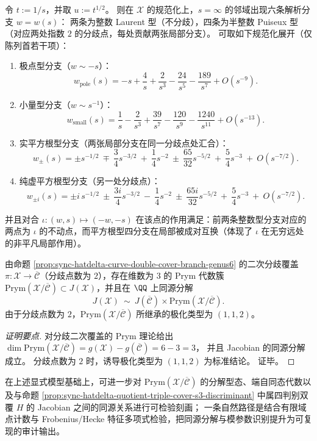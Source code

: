 \begin{remark}[\texorpdfstring{$s=\infty$}{s=infty} 处的 Puiseux 分支分类与显式展开]\label{rem:sync-hatdelta-puiseux-at-infty}
令 \(t:=1/s\)，并取 \(u:=t^{1/2}\)。
则在 \(\mathcal{X}\) 的规范化上，\(s=\infty\) 的邻域出现六条解析分支 \(w=w(s)\)：
两条为整数 Laurent 型（不分歧），四条为半整数 Puiseux 型（对应两处指数 \(2\) 的分歧点，每处贡献两张局部分支）。
可取如下规范化展开（仅陈列首若干项）：
\begin{enumerate}
  \item 极点型分支（\(w\sim -s\)）：
  \[
  w_{\mathrm{pole}}(s)= -s+\frac{4}{s}+\frac{2}{s^3}-\frac{24}{s^5}-\frac{189}{s^7}+O(s^{-9}).
  \]
  \item 小量型分支（\(w\sim s^{-1}\)）：
  \[
  w_{\mathrm{small}}(s)= \frac{1}{s}-\frac{2}{s^3}+\frac{39}{s^7}-\frac{120}{s^9}-\frac{1240}{s^{11}}+O(s^{-13}).
  \]
  \item 实平方根型分支（两张局部分支在同一分歧点处汇合）：
  \[
  w_{\pm}(s)=\pm s^{-1/2}\ \mp\ \frac{3}{4}s^{-3/2}\ +\ \frac{1}{4}s^{-2}\ \pm\ \frac{65}{32}s^{-5/2}\ +\ \frac{5}{4}s^{-3}\ +\ O(s^{-7/2}).
  \]
  \item 纯虚平方根型分支（另一处分歧点）：
  \[
  w_{\pm i}(s)=\pm i\,s^{-1/2}\ \pm\ \frac{3i}{4}s^{-3/2}\ -\ \frac{1}{4}s^{-2}\ \pm\ \frac{65i}{32}s^{-5/2}\ +\ \frac{5}{4}s^{-3}\ +\ O(s^{-7/2}).
  \]
\end{enumerate}
并且对合 \(\iota:(w,s)\mapsto(-w,-s)\) 在该点的作用满足：前两条整数型分支对应的两点为 \(\iota\) 的不动点，而平方根型四分支在局部被成对互换（体现了 \(\iota\) 在无穷远处的非平凡局部作用）。
\end{remark}

\begin{corollary}\label{cor:sync-hatdelta-prym-decomposition}
由命题 \ref{prop:sync-hatdelta-curve-double-cover-branch-genus6} 的二次分歧覆盖 \(\pi:\mathcal{X}\to\overline{\mathcal{C}}\)（分歧点数为 \(2\)），存在维数为 \(3\) 的 Prym 代数簇
\(\mathrm{Prym}(\mathcal{X}/\overline{\mathcal{C}})\subset J(\mathcal{X})\)，并且在 \(\QQ\) 上同源分解
\[
J(\mathcal{X})\ \sim\ J(\overline{\mathcal{C}})\times \mathrm{Prym}(\mathcal{X}/\overline{\mathcal{C}}).
\]
由于分歧点数为 \(2\)，\(\mathrm{Prym}(\mathcal{X}/\overline{\mathcal{C}})\) 所继承的极化类型为 \((1,1,2)\)。
\end{corollary}
\begin{proof}[证明要点]
对分歧二次覆盖的 Prym 理论给出
\(\dim\mathrm{Prym}(\mathcal{X}/\overline{\mathcal{C}})=g(\mathcal{X})-g(\overline{\mathcal{C}})=6-3=3\)，
并且 Jacobian 的同源分解成立。
分歧点数为 \(2\) 时，诱导极化类型为 \((1,1,2)\) 为标准结论。
证毕。
\end{proof}

\par
在上述显式模型基础上，可进一步对 \(\mathrm{Prym}(\mathcal{X}/\overline{\mathcal{C}})\) 的分解型态、端自同态代数以及与命题 \ref{prop:sync-hatdelta-quotient-triple-cover-s3-discriminant} 中属四判别双覆 \(H\) 的 Jacobian 之间的同源关系进行可检验刻画；
一条自然路径是结合有限域点计数与 Frobenius/Hecke 特征多项式检验，把同源分解与模参数识别提升为可复现的审计输出。
